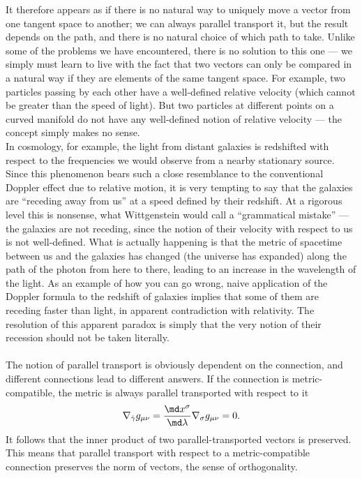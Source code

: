 It therefore appears as if there is no natural way to uniquely move a vector from one
tangent space to another; we can always parallel transport it, but the result depends on the
path, and there is no natural choice of which path to take. Unlike some of the problems we
have encountered, there is no solution to this one — we simply must learn to live with the
fact that two vectors can only be compared in a natural way if they are elements of the same
tangent space. For example, two particles passing by each other have a well-defined relative
velocity (which cannot be greater than the speed of light). But two particles at different
points on a curved manifold do not have any well-defined notion of relative velocity — the
concept simply makes no sense.\\
In cosmology, for example, the light from distant galaxies
is redshifted with respect to the frequencies we would observe from a nearby stationary
source. Since this phenomenon bears such a close resemblance to the conventional Doppler
effect due to relative motion, it is very tempting to say that the galaxies are “receding away
from us” at a speed defined by their redshift. At a rigorous level this is nonsense, what
Wittgenstein would call a “grammatical mistake” — the galaxies are not receding, since the
notion of their velocity with respect to us is not well-defined. What is actually happening
is that the metric of spacetime between us and the galaxies has changed (the universe has expanded) along the path of the photon from here to there, leading to an increase in the
wavelength of the light. As an example of how you can go wrong, naive application of the
Doppler formula to the redshift of galaxies implies that some of them are receding faster than
light, in apparent contradiction with relativity. The resolution of this apparent paradox is
simply that the very notion of their recession should not be taken literally.
\\
\\
The notion of parallel transport is obviously dependent on the connection, and different
connections lead to different answers. If the connection is metric-compatible, the metric is
always parallel transported with respect to it
\begin{equation}
	\nabla_{\dot{\gamma}} g_{\mu \nu} = \frac{\md x^\sigma}{\md \lambda} \nabla_\sigma g_{\mu \nu} =0.
\end{equation}
It follows that the inner product of two parallel-transported vectors is preserved. This means that parallel transport with respect to a metric-compatible connection preserves
the norm of vectors, the sense of orthogonality.

